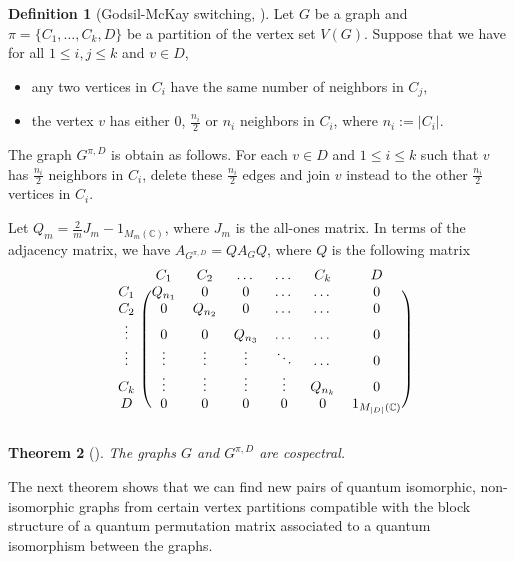 \documentclass[11pt]{article}
\newtheorem{theo}{Theorem}[section]
\theoremstyle{definition}
\newtheorem{defi}[theo]{Definition}
\numberwithin{equation}{section}
\newcommand{\C}{\mathbb{C}}
\begin{document}
\begin{defi}[Godsil-McKay switching, \cite{GM}]\label{GMswitching}
Let $G$ be a graph and $\pi=\{C_1, \dots, C_k, D\}$ be a partition of the vertex set $V(G)$. Suppose that we have for all $1 \leq i,j \leq k$ and $v \in D$,
\begin{itemize}
    \item[(i)] any two vertices in $C_i$ have the same number of neighbors in $C_j$,
    \item[(ii)] the vertex $v$ has either $0$, $\frac{n_i}{2}$ or $n_i$ neighbors in $C_i$, where $n_i:=|C_i|$.
\end{itemize}
The graph $G^{\pi, D}$ is obtain as follows. For each $v\in D$ and $1 \leq i \leq k$ such that $v$ has $\frac{n_i}{2}$ neighbors in $C_i$, delete these $\frac{n_i}{2}$ edges and join $v$ instead to the other $\frac{n_i}{2}$ vertices in $C_i$. 

Let $Q_m=\frac{2}{m}J_m-1_{M_m(\C)}$, where $J_m$ is the all-ones matrix. In terms of the adjacency matrix, we have $A_{G^{\pi, D}}=QA_GQ$, where $Q$ is the following matrix
\begin{align}
\begin{blockarray}{ccccccc}
&C_1&C_2&\dots&\dots&C_k&D\\
\begin{block}{c(cccccc)}
C_1&Q_{n_1}&0&0&\dots&\dots&0\\ C_2&0&Q_{n_2}&0&\dots&\dots&0\\ \vdots&0&0&Q_{n_3}&\dots&\dots&0\\\vdots&\vdots &\vdots&\vdots&\ddots&\dots&0\\
C_k&\vdots &\vdots&\vdots&\vdots&Q_{n_k}&0\\
D&0&0&0&0&0&1_{M_{|D|}(\C)} \\
\end{block}
\end{blockarray}\label{switchingmatrix}
\end{align}
\end{defi}

\begin{theo}[\cite{GM}]
The graphs $G$ and $G^{\pi, D}$ are cospectral.
\end{theo}

The next theorem shows that we can find new pairs of quantum isomorphic, non-isomorphic graphs from certain vertex partitions compatible with the block structure of a quantum permutation matrix associated to a quantum isomorphism between the graphs. 
\end{document}
